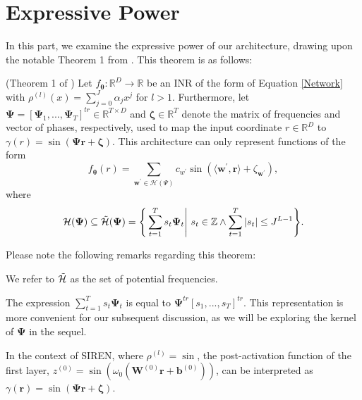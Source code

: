 \section{Expressive Power}
In this part, we examine the expressive power of our architecture, drawing upon the notable Theorem 1 from \citep{yuce2022structured}. This theorem is as follows:
\begin{theorem} \label{expressive_power}
    (Theorem 1 of \citep{yuce2022structured}) Let \(f_{\boldsymbol{\theta}}: \mathbb{R}^D \rightarrow \mathbb{R}\) be an INR of the form of Equation \eqref{Network} with $\rho^{(l)}(x) = \sum_{j=0}^J \alpha_jx^j$ for $l > 1$. Furthermore, let $\boldsymbol{\Psi} = [\boldsymbol{\Psi}_1, ..., \boldsymbol{\Psi}_T]^{tr} \in \mathbb{R}^{T\times D}$ and $\boldsymbol{\zeta}\in\mathbb{R}^T$ denote the matrix of frequencies and vector of phases, respectively, used to map the input coordinate \(r \in \mathbb{R}^D\) to $\gamma(r) = \sin(\boldsymbol{\Psi} \boldsymbol{r} + \boldsymbol{\zeta})$. This architecture can only represent functions of the form
    \[ 
    f_{\boldsymbol{\theta}}(r) = \sum_{\boldsymbol{w^\prime}\in \mathcal{H}(\Psi)} c_{w^\prime } \sin(\langle \boldsymbol{w^\prime}, \boldsymbol{r}\rangle +	\zeta_{\boldsymbol{w^\prime}}),
    \]
    where
    \[ \mathcal{H}(\boldsymbol{\Psi}) \subseteq  \Tilde{\mathcal{H}}(\boldsymbol{\Psi})=\Bigg\{\sum_{t=1}^{T}s_t\boldsymbol{\Psi}_t \Bigg|~s_t \in \mathbb{Z}\wedge \sum_{t=1}^{T} |s_t|\leq J^{L-1}\Bigg\}.
    \]
\end{theorem}
Please note the following remarks regarding this theorem:

\begin{remark}
We refer to $\Tilde{\mathcal{H}}$ as the set of potential frequencies.
\end{remark}

\begin{remark}
The expression $\sum_{t=1}^{T}s_t\boldsymbol{\Psi}_t$ is equal to $\boldsymbol{\Psi}^{tr}[s_1,...,s_{T}]^{tr}$. This representation is more convenient for our subsequent discussion, as we will be exploring the kernel of $\boldsymbol{\Psi}$ in the sequel.
\end{remark}

\begin{remark}
In the context of SIREN, where $\rho^{(l)}=\sin$, the post-activation function of the first layer, $z^{(0)}=\sin(\omega_0(\boldsymbol{W}^{(0)}\boldsymbol{r}+\boldsymbol{b}^{(0)}))$, can be interpreted as $\gamma(\boldsymbol{r})=\sin(\boldsymbol{\Psi r}+\boldsymbol{\zeta})$.
\end{remark}

